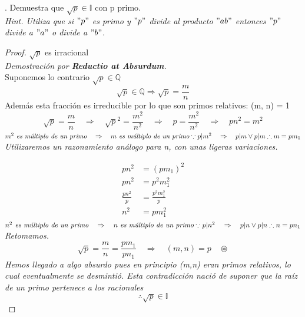 \documentclass{article}
\begin{document}
  
  . Demuestra que \(\sqrt{p} \in \mathbb{I}\) con p primo.\\
  \textit{Hint. Utiliza que si \("p"\) es primo y \("p"\) divide al producto \("ab"\) entonces \("p"\) divide a \("a"\) o divide a \("b"\).}\\
  \begin{proof}
      \( \sqrt{p} \) es irracional\\
      \textit{Demostración por \textbf{Reductio at Absurdum}.} \\
      Suponemos lo contrario \(\sqrt{p} \in \mathbb{Q}\) \\
      \[  \sqrt{p} \in \mathbb{Q} \Rightarrow \sqrt{p} = \frac{m}{n}  \]
      Además esta fracción es irreducible por lo que son primos relativos: (m, n) = 1 \\
      \[ \sqrt{p} = \frac{m}{n} \quad \Rightarrow \quad \sqrt{p}^2 = \frac{m^2}{n^2} \quad \Rightarrow \quad p = \frac{m^2}{n^2} \quad \Rightarrow \quad pn^2 = m^2 \]
      \(m^2 \textit{  es múltiplo de un primo} \quad \Rightarrow \quad m \textit{  es múltiplo de un primo} \\
      \because p|m^2 \quad \Rightarrow \quad p|m \lor p|m \\
      \therefore m = pm_1 \) \\
      \textit{Utilizaremos un razonamiento análogo para n, con unas ligeras variaciones.}
      
      \begin{align*}
    pn^2 &= (pm_1)^2 \\
    pn^2 &= p^2m_1^2 \\
    \frac{pn^2}{p} &= \frac{p^2m_1^2}{p} \\
    n^2 &= pm_1^2
      \end{align*}
      \(n^2 \textit{  es múltiplo de un primo} \quad \Rightarrow \quad n \textit{  es múltiplo de un primo} \\
      \because p|n^2 \quad \Rightarrow \quad p|n \lor p|n \\
      \therefore n = pn_1 \) \\
      \textit{Retomamos.} \\
      \[ \sqrt{p} = \frac{m}{n} = \frac{pm_1}{pn_1} \quad \Rightarrow \quad (m,n) = p \quad \circledast \]
      \textit{Hemos llegado a algo absurdo pues en principio (m,n) eran primos relativos, lo cual eventualmente se desmintió. Esta contradicción nació de suponer que la raíz de un primo pertenece a los racionales}\\
      \[ \therefore \sqrt{p} \in \mathbb{I} \]
      
  \end{proof}
\end{document}
